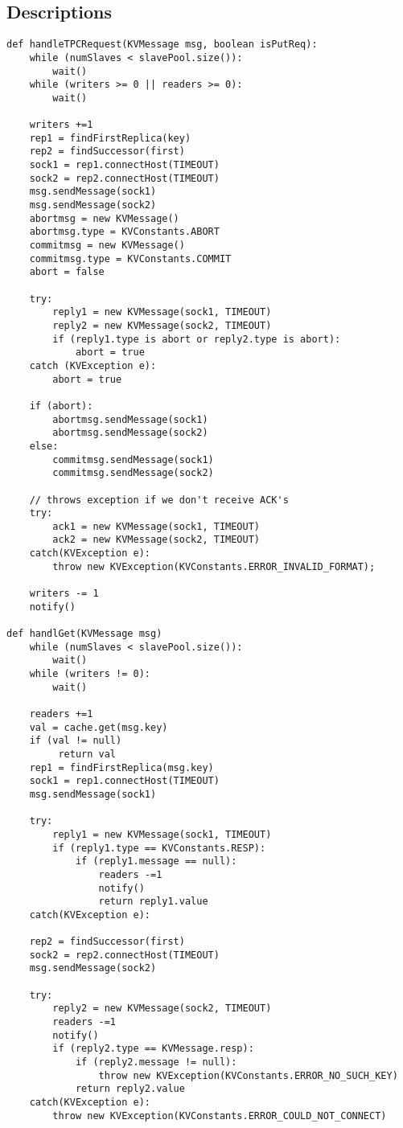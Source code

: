 \subsection{Descriptions}
\begin{verbatim}
def handleTPCRequest(KVMessage msg, boolean isPutReq):
    while (numSlaves < slavePool.size()):
        wait()
    while (writers >= 0 || readers >= 0):
        wait()

    writers +=1
    rep1 = findFirstReplica(key)
    rep2 = findSuccessor(first)
    sock1 = rep1.connectHost(TIMEOUT)
    sock2 = rep2.connectHost(TIMEOUT)
    msg.sendMessage(sock1)
    msg.sendMessage(sock2)
    abortmsg = new KVMessage()
    abortmsg.type = KVConstants.ABORT
    commitmsg = new KVMessage()
    commitmsg.type = KVConstants.COMMIT
    abort = false

    try:
        reply1 = new KVMessage(sock1, TIMEOUT)
        reply2 = new KVMessage(sock2, TIMEOUT)
        if (reply1.type is abort or reply2.type is abort):
            abort = true
    catch (KVException e):
        abort = true

    if (abort):
        abortmsg.sendMessage(sock1)
        abortmsg.sendMessage(sock2)
    else:
        commitmsg.sendMessage(sock1)
        commitmsg.sendMessage(sock2)

    // throws exception if we don't receive ACK's
    try:
        ack1 = new KVMessage(sock1, TIMEOUT)
        ack2 = new KVMessage(sock2, TIMEOUT)
    catch(KVException e):
        throw new KVException(KVConstants.ERROR_INVALID_FORMAT);
    
    writers -= 1
    notify()

def handlGet(KVMessage msg)
    while (numSlaves < slavePool.size()):
        wait()
    while (writers != 0):
        wait()

    readers +=1
    val = cache.get(msg.key)
    if (val != null)
         return val
    rep1 = findFirstReplica(msg.key)
    sock1 = rep1.connectHost(TIMEOUT)
    msg.sendMessage(sock1)
    
    try:
        reply1 = new KVMessage(sock1, TIMEOUT)
        if (reply1.type == KVConstants.RESP):
            if (reply1.message == null):
                readers -=1 
                notify()
                return reply1.value 
    catch(KVException e):
    
    rep2 = findSuccessor(first)
    sock2 = rep2.connectHost(TIMEOUT) 
    msg.sendMessage(sock2)
     
    try:      
        reply2 = new KVMessage(sock2, TIMEOUT)
        readers -=1
        notify()
        if (reply2.type == KVMessage.resp):
            if (reply2.message != null):
                throw new KVException(KVConstants.ERROR_NO_SUCH_KEY)                  
            return reply2.value 
    catch(KVException e):
        throw new KVException(KVConstants.ERROR_COULD_NOT_CONNECT)
    
      
    
\end{verbatim}
